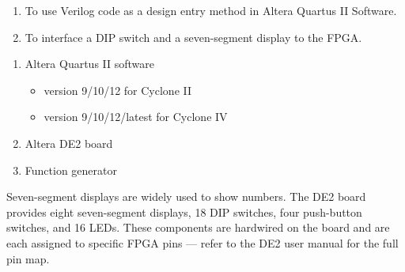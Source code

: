 
\begin{objectives}
    \begin{enumerate}
        \item To use Verilog code as a design entry method in Altera Quartus II Software.
        \item To interface a DIP switch and a seven-segment display to the FPGA.
    \end{enumerate}
\end{objectives}

\begin{equipment}
    \begin{enumerate}
        \item Altera Quartus II software
              \begin{itemize}
                  \item version 9/10/12 for Cyclone II
                  \item version 9/10/12/latest for Cyclone IV
              \end{itemize}
        \item Altera DE2 board
        \item Function generator
    \end{enumerate}
\end{equipment}

\begin{introduction}
    Seven-segment displays are widely used to show numbers. The DE2 board provides eight seven-segment displays, 18 DIP switches, four push-button switches, and 16 LEDs. These components are hardwired on the board and are each assigned to specific FPGA pins --- refer to the DE2 user manual for the full pin map.
\end{introduction}

